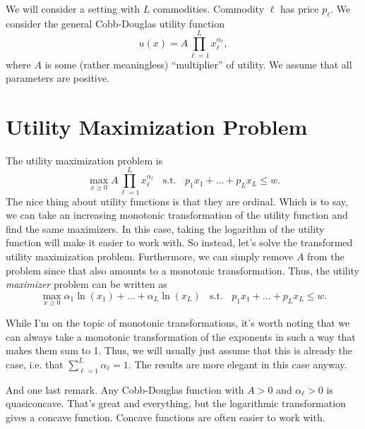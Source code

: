 \documentclass[12pt]{article}
\theoremstyle{definition}
\begin{document}
\maketitle
\singlespace
We will consider a setting with $L$ commodities. Commodity $\ell$ has price $p_{\ell}$. We consider the general Cobb-Douglas utility function
	\[	u(x)=A \prod_{{\ell}=1}^L x_{\ell}^{\alpha_{\ell}},\]
where $A$ is some (rather meaningless) ``multiplier'' of utility. We assume that all parameters are positive.



\section{Utility Maximization Problem}
The utility maximization problem is 
	\[	\max_{x \geq 0} A \prod_{{\ell}=1}^L x_{\ell}^{\alpha_{\ell}}  \;\; \text{ s.t. } \;\;  p_1x_1 + ... + p_Lx_L \leq w. \]		
The nice thing about utility functions is that they are ordinal. Which is to say, we can take an increasing monotonic transformation of the utility function and find the same maximizers. In this case, taking the logarithm of the utility function will make it easier to work with. So instead, let's solve the transformed utility maximization problem. Furthermore, we can simply remove $A$ from the problem since that also amounts to a monotonic transformation. Thus, the utility \emph{maximizer} problem can be written as
	\[	\max_{x \geq 0} \alpha_1\ln(x_1) + ... + \alpha_L\ln(x_L)  \;\; \text{ s.t. } \;\;  p_1x_1 + ... + p_Lx_L \leq w. \]

While I'm on the topic of monotonic transformations, it's worth noting that we can always take a monotonic transformation of the exponents in such a way that makes them sum to 1. Thus, we will usually just assume that this is already the case, i.e. that $\sum_{\ell=1}^L\alpha_{\ell} =1$. The results are more elegant in this case anyway.	

And one last remark. Any Cobb-Douglas function with $A>0$ and $\alpha_{\ell}>0$ is quasiconcave. That's great and everything, but the logarithmic transformation gives a concave function. Concave functions are often easier to work with. 

    
\end{document}
